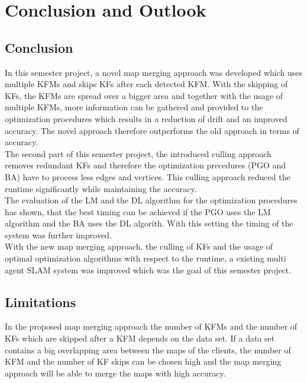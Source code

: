 \chapter{Conclusion and Outlook}

\section{Conclusion}
In this semester project, a novel map merging approach was developed which uses multiple \acp{KFM} and skips \acp{KF} after each detected \ac{KFM}. With the skipping of \acp{KF}, the \acp{KFM} are spread over a bigger area and together with the usage of multiple \acp{KFM}, more information can be gathered and provided to the optimization procedures which results in a reduction of drift and an improved accuracy. The novel approach therefore outperforms the old approach in terms of accuracy.\\

The second part of this semester project, the introduced culling approach removes redundant \acp{KF} and therefore the optimization precedures (\ac{PGO} and \ac{BA}) have to process less edges and vertices. This culling approach reduced the runtime significantly while maintaining the accuracy.\\

The evaluation of the \ac{LM} and the \ac{DL} algorithm for the optimization procedures has shown, that the best timing can be achieved if the \ac{PGO} uses the \ac{LM} algorithm and the \ac{BA} uses the \ac{DL} algorith. With this setting the timing of the system was further improved.\\

With the new map merging approach, the culling of \acp{KF} and the usage of optimal optimization algorithms with respect to the runtime, a existing multi agent \ac{SLAM} system was improved which was the goal of this semester project.

\section{Limitations}
In the proposed map merging approach the number of \acp{KFM} and the number of \acp{KF} which are skipped after a \ac{KFM} depends on the data set. If a data set contains a big overlapping area between the maps of the clients, the number of \ac{KFM} and the number of \ac{KF} skips can be chosen high and the map merging approach will be able to merge the maps with high accuracy.

